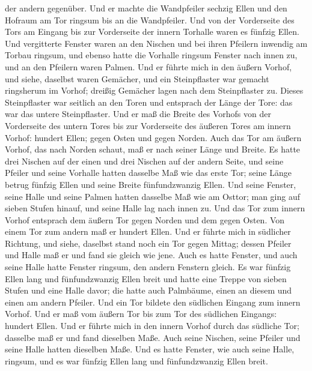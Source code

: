 der andern gegenüber.  Und er machte die Wandpfeiler
sechzig Ellen und den Hofraum am Tor ringsum bis an die Wandpfeiler.
 Und von der Vorderseite des Tors am Eingang bis zur
Vorderseite der innern Torhalle waren es fünfzig Ellen. 
Und vergitterte Fenster waren an den Nischen und bei ihren Pfeilern
inwendig am Torbau ringsum, und ebenso hatte die Vorhalle ringsum
Fenster nach innen zu, und an den Pfeilern waren Palmen. 
Und er führte mich in den äußern Vorhof, und siehe, daselbst waren
Gemächer, und ein Steinpflaster war gemacht ringsherum im Vorhof;
dreißig Gemächer lagen nach dem Steinpflaster zu.  Dieses
Steinpflaster war seitlich an den Toren und entsprach der Länge der
Tore: das war das untere Steinpflaster.  Und er maß die
Breite des Vorhofs von der Vorderseite des untern Tores bis zur
Vorderseite des äußeren Tores am innern Vorhof: hundert Ellen; gegen
Osten und gegen Norden.  Auch das Tor am äußern Vorhof,
das nach Norden schaut, maß er nach seiner Länge und Breite.
 Es hatte drei Nischen auf der einen und drei Nischen auf
der andern Seite, und seine Pfeiler und seine Vorhalle hatten dasselbe
Maß wie das erste Tor; seine Länge betrug fünfzig Ellen und seine Breite
fünfundzwanzig Ellen.  Und seine Fenster, seine Halle und
seine Palmen hatten dasselbe Maß wie am Osttor; man ging auf sieben
Stufen hinauf, und seine Halle lag nach innen zu.  Und
das Tor zum innern Vorhof entsprach dem äußern Tor gegen Norden und dem
gegen Osten. Von einem Tor zum andern maß er hundert Ellen.
 Und er führte mich in südlicher Richtung, und siehe,
daselbst stand noch ein Tor gegen Mittag; dessen Pfeiler und Halle maß
er und fand sie gleich wie jene.  Auch es hatte Fenster,
und auch seine Halle hatte Fenster ringsum, den andern Fenstern gleich.
Es war fünfzig Ellen lang und fünfundzwanzig Ellen breit 
und hatte eine Treppe von sieben Stufen und eine Halle davor; die hatte
auch Palmbäume, einen an diesem und einen am andern Pfeiler.
 Und ein Tor bildete den südlichen Eingang zum innern
Vorhof. Und er maß vom äußern Tor bis zum Tor des südlichen Eingangs:
hundert Ellen.  Und er führte mich in den innern Vorhof
durch das südliche Tor; dasselbe maß er und fand dieselben Maße.
 Auch seine Nischen, seine Pfeiler und seine Halle hatten
dieselben Maße. Und es hatte Fenster, wie auch seine Halle, ringsum, und
es war fünfzig Ellen lang und fünfundzwanzig Ellen breit.

